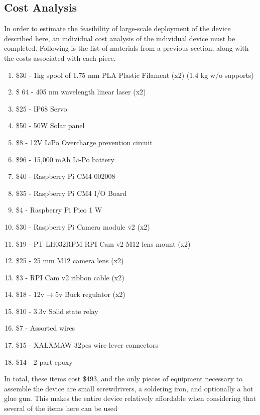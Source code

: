 \documentclass[fleqn,10pt]{SelfArx} %
\begin{document}
	\subsection{Cost Analysis}
	
	In order to estimate the feasibility of large-scale deployment of the device described here, an individual cost analysis of the individual device must be completed. Following is the list of materials from a previous section, along with the costs associated with each piece. 
	
	\begin{enumerate}
		
		\item \$30 - 1kg spool of 1.75 mm PLA Plastic Filament (x2) (1.4 kg w/o supports)
		\item \$ 64 - 405 nm wavelength linear laser (x2)
		\item \$25 - IP68 Servo
		\item \$50 - 50W Solar panel
		\item \$8 - 12V LiPo Overcharge prevention circuit
		\item \$96 - 15,000 mAh Li-Po battery
		\item \$40 - Raspberry Pi CM4 002008
		\item \$35 - Raspberry Pi CM4 I/O Board
		\item \$4 - Raspberry Pi Pico 1 W
		\item \$30 - Raspberry Pi Camera module v2 (x2)
		\item \$19 - PT-LH032RPM \gls{RPI} Cam v2 M12 lens mount (x2)
		\item \$25 - 25 mm M12 camera lens (x2)
		\item \$3 - \gls{RPI} Cam v2 ribbon cable (x2)
		\item \$18 - 12v$\rightarrow$5v Buck regulator (x2)
		\item \$10 - 3.3v Solid state relay
		\item \$7 - Assorted wires
		\item \$15 - XALXMAW 32pcs wire lever connectors
		\item \$14 - 2 part epoxy 
	\end{enumerate}
	
	In total, these items cost \$493, and the only pieces of equipment necessary to assemble the device are small screwdrivers, a soldering iron, and optionally a hot glue gun. This makes the entire device relatively affordable when considering that several of the items here can be used
	
\end{document}
